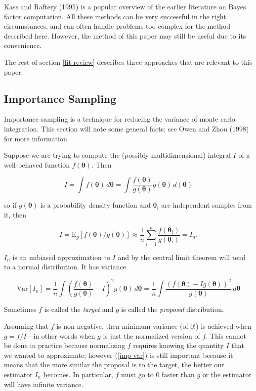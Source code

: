 \documentclass[letterpaper,12pt]{article}
\newcommand{\btheta}{\boldsymbol \theta}
\newcommand{\myvar}{\mbox{Var}}
\newcommand{\myexp}{\mbox{E}}
\begin{document}
\noindent Kass and Raftery (1995) is a popular overview of the earlier
literature on Bayes factor computation.  All these methods can be very
successful in the right circumstances, and can often handle problems
too complex for the method described here.  However, the method of
this paper may still be useful due to its convenience.

The rest of section \ref{lit review} describes three approaches that
are relevant to this paper.

\subsection{Importance Sampling}
\label{imp sampling}

Importance sampling is a technique for reducing the variance of monte
carlo integration.  This section will note some general facts; see
Owen and Zhou (1998) for more information.

Suppose we are trying to compute the (possibly multidimensional)
integral $I$ of a well-behaved function $f(\btheta)$.  Then

\begin{equation*}
  I = \int f(\btheta) \, d\btheta =
  \int \frac{f(\btheta)}{g(\btheta)} g(\btheta) \, d(\btheta)
\end{equation*}

\noindent so if $g(\btheta)$ is a probability density function and
$\btheta_i$ are independent samples from it, then 

\begin{equation}
  \label{imp approx}
  I = \myexp_g[f(\btheta)/g(\btheta)] \approx \frac{1}{n} \sum_{i=1}^n \frac{f(\btheta_i)}{g(\btheta_i)} = I_n.
\end{equation}

\noindent $I_n$ is an unbiased approximation to $I$ and by the central
limit theorem will tend to a normal distribution.  It has variance

\begin{equation}
  \label{imp var}
  \myvar[I_n] = \frac{1}{n} \int \left(\frac{f(\btheta)}{g(\btheta)} - I\right)^2 g(\btheta)\, d\btheta = 
  \frac{1}{n} \int \frac{(f(\btheta) - Ig(\btheta))^2}{g(\btheta)}\, d\btheta
\end{equation}

\noindent Sometimes $f$ is called the \emph{target} and $g$ is called
the \emph{proposal} distribution.

Assuming that $f$ is non-negative, then minimum variance (of $0!$) is
achieved when $g = f / I$---in other words when $g$ is just the
normalized version of $f$.  This cannot be done in practice because
normalizing $f$ requires knowing the quantity $I$ that we wanted to
approximate; however (\ref{imp var}) is still important because it
means that the more similar the proposal is to the target, the better
our estimator $I_n$ becomes.  In particular, $f$ must go to 0 faster
than $g$ or the estimator will have infinite variance.
\end{document}
